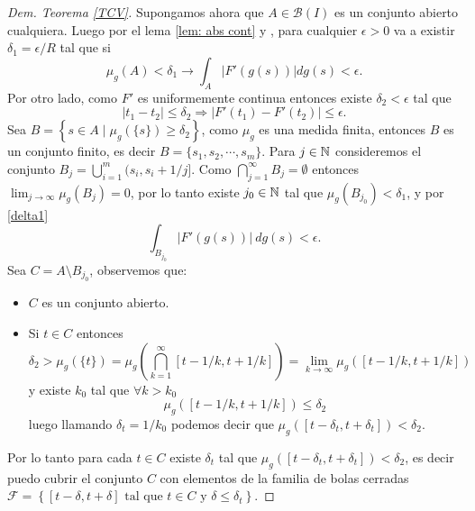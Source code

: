 \begin{proof}[Dem. Teorema \eqref{TCV}]
Supongamos ahora que  $A\in \mathcal{B}(I)$ es un conjunto abierto cualquiera. Luego por el lema \ref{lem: abs cont} y   \cite[Teorema 3.5]{folland}, para cualquier $\epsilon>0$ va a existir $\delta_1=\epsilon/R$ tal que si
	\begin{equation}
	\mu_g(A)< \delta_1 \rightarrow \int_{A}|F'(g(s))|dg(s)< \epsilon. \label{delta1}
	\end{equation}
Por otro lado, como $F'$ es uniformemente continua entonces existe $\delta_2<\epsilon$ tal que 
	\begin{equation}
		|t_1-t_2|\leq  \delta_2\Rightarrow |F'(t_1)-F'(t_2)|\leq \epsilon. \label{delta2}
	\end{equation}
	Sea $B=\left\lbrace s\in A \mid \mu_{g}(\{s\})\geq \delta_2\right\rbrace $, como $\mu_{g}$ es una medida finita, entonces $B$ es un conjunto finito, es decir $B=\{s_1,s_2,\cdots,s_m\}$. Para $j\in\mathbb{N}$ consideremos el conjunto $\displaystyle B_j=\bigcup_{i=1}^{m}(s_i, s_i+1/j]$. Como $\displaystyle \bigcap_{j=1}^{\infty}B_j=\emptyset$ entonces $\displaystyle \lim_{j\to\infty}\mu_{g}(B_j)=0$, por lo tanto existe $j_0\in \mathbb{N}$ tal que $\mu_{g}(B_{j_0})<\delta_1$, y por \ref{delta1} $$\int_{B_{j_0}}|F'(g(s))|\: dg(s)< \epsilon. $$
	Sea $C=A\setminus{B_{j_0}}$, observemos que:
	\begin{itemize}
		\item $C$ es un conjunto abierto.
		\item Si $t\in C$ entonces
	$$\delta_2>\mu_{g}(\{t\})=\mu_{g}\left( \bigcap_{k=1}^{\infty}[t-1/k,t+1/k] \right)=\lim\limits_{k\to\infty}\mu_{g}\left([t-1/k,t+1/k] \right) $$
y existe $k_0$ tal que $\forall k>k_0$
	$$\mu_{g}\left([t-1/k,t+1/k] \right)\leq \delta_2$$
	luego llamando $\delta_t=1/k_0$ podemos decir que $\mu_{g}\left([t-\delta_t,t+\delta_t] \right)<\delta_2$.
		\end{itemize}  
	Por lo tanto para cada $t\in C$ existe $\delta_t$ tal que $\mu_{g}\left([t-\delta_t,t+\delta_t] \right)<\delta_2$, es decir puedo cubrir el conjunto $C$ con elementos de la familia de bolas cerradas $\mathcal{F}=\left\lbrace [t-\delta,t+\delta] \text{ tal que } t\in C \text{ y }\delta\leq \delta_t\right\rbrace .$


\end{proof}
